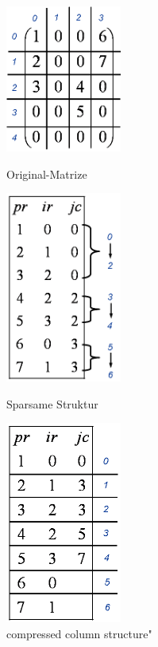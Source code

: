 
\begin{figure}[htbp]
	\includegraphics[width=1.5in]{.//pic//orignal_sparse}
	\caption{Original-Matrize}
	\includegraphics[width=1.5in]{.//pic//numerische_sparse1}
	\caption{Sparsame Struktur}
	\includegraphics[width=1.5in]{.//pic//numerische_sparse2}
	\caption{compressed column structure"}

\end{figure}